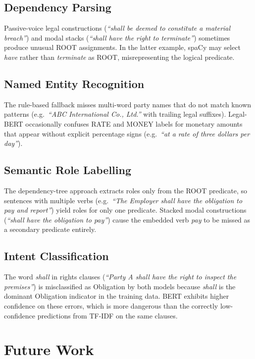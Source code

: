 \documentclass[12pt,a4paper]{report}
\begin{document}
\subsection*{Dependency Parsing}
Passive-voice legal constructions (\textit{``shall be deemed to constitute a
material breach''}) and modal stacks (\textit{``shall have the right to terminate''})
sometimes produce unusual ROOT assignments.  In the latter example, spaCy may
select \textit{have} rather than \textit{terminate} as ROOT, misrepresenting the
logical predicate.

\subsection*{Named Entity Recognition}
The rule-based fallback misses multi-word party names that do not match known
patterns (e.g.\ \textit{``ABC International Co., Ltd.''} with trailing legal
suffixes).  Legal-BERT occasionally confuses RATE and MONEY labels for monetary
amounts that appear without explicit percentage signs (e.g.\ \textit{``at a rate
of three dollars per day''}).

\subsection*{Semantic Role Labelling}
The dependency-tree approach extracts roles only from the ROOT predicate, so
sentences with multiple verbs (e.g.\ \textit{``The Employer shall have the
obligation to pay and report''}) yield roles for only one predicate.  Stacked modal
constructions (\textit{``shall have the obligation to pay''}) cause the embedded
verb \textit{pay} to be missed as a secondary predicate entirely.

\subsection*{Intent Classification}
The word \textit{shall} in rights clauses (\textit{``Party A shall have the right
to inspect the premises''}) is misclassified as Obligation by both models because
\textit{shall} is the dominant Obligation indicator in the training data.  BERT
exhibits higher confidence on these errors, which is more dangerous than the
correctly low-confidence predictions from TF-IDF on the same clauses.

\section{Future Work}
\label{sec:future-work}
\end{document}
